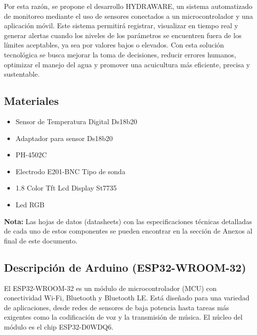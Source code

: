 \documentclass[a4paper,12pt]{article}
\begin{document}
	Por esta razón, se propone el desarrollo HYDRAWARE, un sistema automatizado de monitoreo mediante el uso de sensores conectados a un microcontrolador y una aplicación móvil. Este sistema permitirá registrar, visualizar en tiempo real y generar alertas cuando los niveles de los parámetros se encuentren fuera de los límites aceptables, ya sea por valores bajos o elevados. Con esta solución tecnológica se busca mejorar la toma de decisiones, reducir errores humanos, optimizar el manejo del agua y promover una acuicultura más eficiente, precisa y sustentable.
	
	\subsection{Materiales}
	\begin{itemize}
		\item Sensor de Temperatura Digital Ds18b20
		\item Adaptador para sensor Ds18b20
		\item PH-4502C
		\item Electrodo E201-BNC Tipo de sonda
		\item 1.8 Color Tft Lcd Display St7735
		\item Led RGB
	\end{itemize}
	\textbf{Nota:} Las hojas de datos (datasheets) con las especificaciones técnicas detalladas de cada uno de estos componentes se pueden encontrar en la sección de Anexos al final de este documento.
	
	
	\subsection{Descripción de Arduino (ESP32-WROOM-32)}
	El ESP32-WROOM-32 es un módulo de microcontrolador (MCU) con conectividad Wi-Fi, Bluetooth y Bluetooth LE. Está diseñado para una variedad de aplicaciones, desde redes de sensores de baja potencia hasta tareas más exigentes como la codificación de voz y la transmisión de música. El núcleo del módulo es el chip ESP32-D0WDQ6.
	
\end{document}
